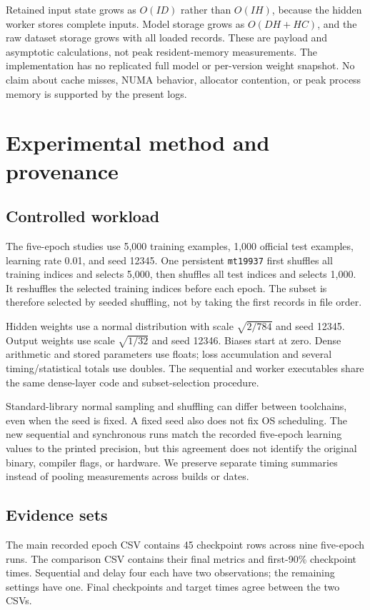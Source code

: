 \documentclass[conference]{IEEEtran}
\begin{document}
Retained input state grows as $O(ID)$ rather than $O(IH)$, because the hidden worker stores complete inputs. Model storage grows as $O(DH+HC)$, and the raw dataset storage grows with all loaded records. These are payload and asymptotic calculations, not peak resident-memory measurements. The implementation has no replicated full model or per-version weight snapshot. No claim about cache misses, NUMA behavior, allocator contention, or peak process memory is supported by the present logs.

\section{Experimental method and provenance}
\subsection{Controlled workload}
The five-epoch studies use 5,000 training examples, 1,000 official test examples, learning rate 0.01, and seed 12345. One persistent \texttt{mt19937} first shuffles all training indices and selects 5,000, then shuffles all test indices and selects 1,000. It reshuffles the selected training indices before each epoch. The subset is therefore selected by seeded shuffling, not by taking the first records in file order.

Hidden weights use a normal distribution with scale $\sqrt{2/784}$ and seed 12345. Output weights use scale $\sqrt{1/32}$ and seed 12346. Biases start at zero. Dense arithmetic and stored parameters use floats; loss accumulation and several timing/statistical totals use doubles. The sequential and worker executables share the same dense-layer code and subset-selection procedure.

Standard-library normal sampling and shuffling can differ between toolchains, even when the seed is fixed. A fixed seed also does not fix OS scheduling. The new sequential and synchronous runs match the recorded five-epoch learning values to the printed precision, but this agreement does not identify the original binary, compiler flags, or hardware. We preserve separate timing summaries instead of pooling measurements across builds or dates.

\subsection{Evidence sets}
The main recorded epoch CSV contains 45 checkpoint rows across nine five-epoch runs. The comparison CSV contains their final metrics and first-90\% checkpoint times. Sequential and delay four each have two observations; the remaining settings have one. Final checkpoints and target times agree between the two CSVs.
\end{document}
